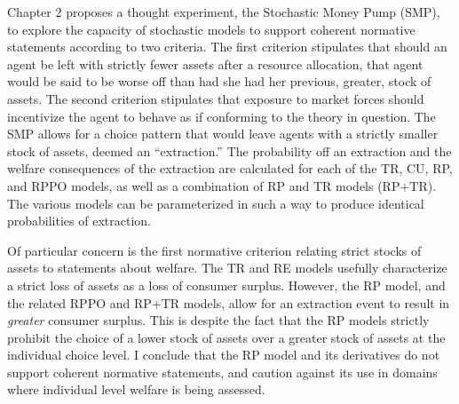 \documentclass[../main.tex]{subfiles}
\begin{document}
\addtocounter{footnote}{-1}

Chapter 2 proposes a thought experiment, the Stochastic Money Pump (SMP), to explore the capacity of stochastic models to support coherent normative statements according to two criteria.
The first criterion stipulates that should an agent be left with strictly fewer assets after a resource allocation, that agent would be said to be worse off than had she had her previous, greater, stock of assets.
The second criterion stipulates that exposure to market forces should incentivize the agent to behave as if conforming to the theory in question.
The SMP allows for a choice pattern that would leave agents with a strictly smaller stock of assets, deemed an \enquote{extraction.}
The probability off an extraction and the welfare consequences of the extraction are calculated for each of the TR, CU, RP, and RPPO models, as well as a combination of RP and TR models (RP+TR).
The various models can be parameterized in such a way to produce identical probabilities of extraction.

Of particular concern is the first normative criterion relating strict stocks of assets to statements about welfare.
The TR and RE models usefully characterize a strict loss of assets as a loss of consumer surplus.
However, the RP model, and the related RPPO and RP+TR models, allow for an extraction event to result in \textit{greater} consumer surplus.
This is despite the fact that the RP models strictly prohibit the choice of a lower stock of assets over a greater stock of assets at the individual choice level.
I conclude that the RP model and its derivatives do not support coherent normative statements, and caution against its use in domains where individual level welfare is being assessed.
\end{document}

